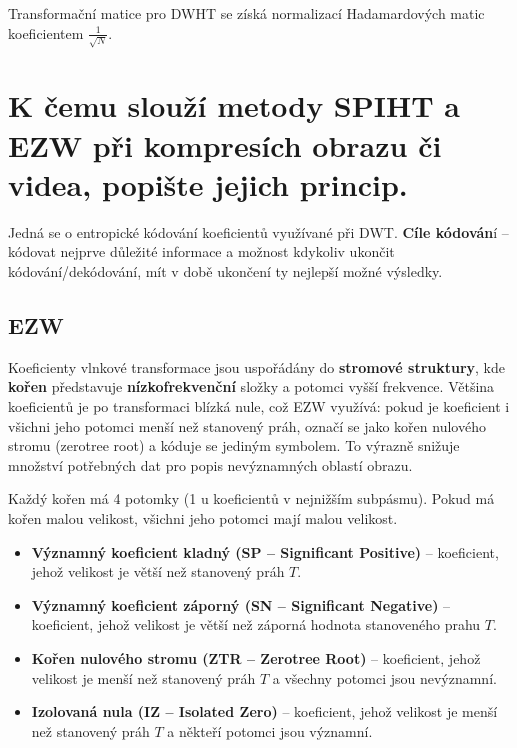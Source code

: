 Transformační matice pro DWHT se získá normalizací Hadamardových matic koeficientem $\frac{1}{\sqrt{N}}$.

\section{K čemu slouží metody SPIHT a EZW při kompresích obrazu či videa, popište jejich princip.}

Jedná se o entropické kódování koeficientů využívané při DWT. \textbf{Cíle kódován}í -- kódovat nejprve důležité informace a možnost kdykoliv ukončit kódování/dekódování, mít v době ukončení ty nejlepší možné výsledky.


\subsection{EZW}

Koeficienty vlnkové transformace jsou uspořádány do \textbf{stromové struktury}, kde \textbf{kořen} představuje \textbf{nízkofrekvenční} složky a potomci vyšší frekvence. Většina koeficientů je po transformaci blízká nule, což EZW využívá: pokud je koeficient i všichni jeho potomci menší než stanovený práh, označí se jako kořen nulového stromu (zerotree root) a kóduje se jediným symbolem. To výrazně snižuje množství potřebných dat pro popis nevýznamných oblastí obrazu.

Každý kořen má 4 potomky (1 u koeficientů v nejnižším subpásmu). Pokud má kořen malou velikost, všichni
jeho potomci mají malou velikost.

\begin{itemize}
\item \textbf{Významný koeficient kladný (SP -- Significant Positive)} --  koeficient, jehož velikost je větší než stanovený práh $T$.

\item \textbf{Významný koeficient záporný (SN -- Significant Negative)} -- koeficient, jehož velikost je větší než záporná hodnota stanoveného prahu $T$.

\item \textbf{Kořen nulového stromu (ZTR -- Zerotree Root)} -- koeficient, jehož velikost je menší než stanovený práh $T$ a všechny potomci jsou nevýznamní.

\item \textbf{Izolovaná nula (IZ -- Isolated Zero)} -- koeficient, jehož velikost je menší než stanovený práh $T$ a někteří potomci jsou významní.
\end{itemize}

